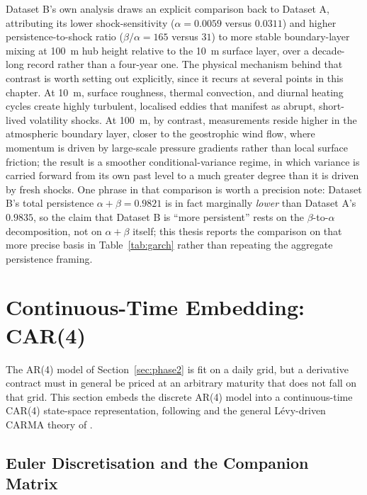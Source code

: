 Dataset B's own analysis draws an explicit comparison back to Dataset A, attributing its lower shock-sensitivity ($\alpha = 0.0059$ versus $0.0311$) and higher persistence-to-shock ratio ($\beta/\alpha = 165$ versus $31$) to more stable boundary-layer mixing at 100~m hub height relative to the 10~m surface layer, over a decade-long record rather than a four-year one. The physical mechanism behind that contrast is worth setting out explicitly, since it recurs at several points in this chapter. At 10~m, surface roughness, thermal convection, and diurnal heating cycles create highly turbulent, localised eddies that manifest as abrupt, short-lived volatility shocks. At 100~m, by contrast, measurements reside higher in the atmospheric boundary layer, closer to the geostrophic wind flow, where momentum is driven by large-scale pressure gradients rather than local surface friction; the result is a smoother conditional-variance regime, in which variance is carried forward from its own past level to a much greater degree than it is driven by fresh shocks. One phrase in that comparison is worth a precision note: Dataset B's total persistence $\alpha+\beta = 0.9821$ is in fact marginally \emph{lower} than Dataset A's $0.9835$, so the claim that Dataset B is ``more persistent'' rests on the $\beta$-to-$\alpha$ decomposition, not on $\alpha+\beta$ itself; this thesis reports the comparison on that more precise basis in Table~\ref{tab:garch} rather than repeating the aggregate persistence framing.

\section{Continuous-Time Embedding: CAR(4)}
\label{sec:phase4}

The AR(4) model of Section~\ref{sec:phase2} is fit on a daily grid, but a derivative contract must in general be priced at an arbitrary maturity that does not fall on that grid. This section embeds the discrete AR(4) model into a continuous-time CAR(4) state-space representation, following \citet{BenthSaltyteBenth2009} and the general Lévy-driven CARMA theory of \citet{BrockwellMarquardt2005}.

\subsection{Euler Discretisation and the Companion Matrix}
\label{sec:phase4-euler}

